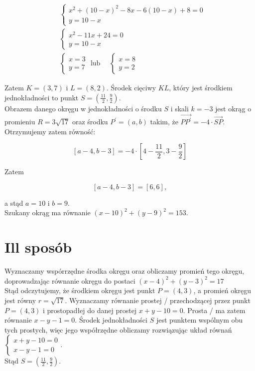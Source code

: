 \documentclass[10pt]{article}
\begin{document}
$$
\begin{aligned}
& \left\{\begin{array}{l}
x^{2}+(10-x)^{2}-8 x-6(10-x)+8=0 \\
y=10-x
\end{array}\right. \\
& \left\{\begin{array}{l}
x^{2}-11 x+24=0 \\
y=10-x
\end{array}\right. \\
& \left\{\begin{array} { l } 
{ x = 3 } \\
{ y = 7 }
\end{array} \text { lub } \quad \left\{\begin{array}{l}
x=8 \\
y=2
\end{array}\right.\right.
\end{aligned}
$$

Zatem $K=(3,7)$ i $L=(8,2)$. Środek cięciwy $K L$, który jest środkiem jednokładności to punkt $S=\left(\frac{11}{2}, \frac{9}{2}\right)$.\\
Obrazem danego okręgu w jednokładności o środku $S$ i skali $k=-3$ jest okrąg o promieniu $R=3 \sqrt{17}$ oraz środku $P^{\prime}=(a, b)$ takim, że $\overrightarrow{P P^{\prime}}=-4 \cdot \overrightarrow{S P}$. Otrzymujemy zatem równość:

$$
[a-4, b-3]=-4 \cdot\left[4-\frac{11}{2}, 3-\frac{9}{2}\right]
$$

Zatem

$$
[a-4, b-3]=[6,6],
$$

a stąd $a=10$ i $b=9$.\\
Szukany okrąg ma równanie $(x-10)^{2}+(y-9)^{2}=153$.

\section*{Ill sposób}
Wyznaczamy wspórrzędne środka okręgu oraz obliczamy promień tego okręgu, doprowadzając równanie okręgu do postaci $(x-4)^{2}+(y-3)^{2}=17$\\
Stąd odczytujemy, że środkiem okręgu jest punkt $P=(4,3)$, a promień okręgu jest równy $r=\sqrt{17}$. Wyznaczamy równanie prostej / przechodzącej przez punkt $P=(4,3)$ i prostopadłej do danej prostej $x+y-10=0$. Prosta / ma zatem równanie $x-y-1=0$. Środek jednokładności $S$ jest punktem wspólnym obu tych prostych, więc jego współrzędne obliczamy rozwiązując układ równań $\left\{\begin{array}{l}x+y-10=0 \\ x-y-1=0\end{array}\right.$.\\
Stąd $S=\left(\frac{11}{2}, \frac{9}{2}\right)$.
\end{document}
